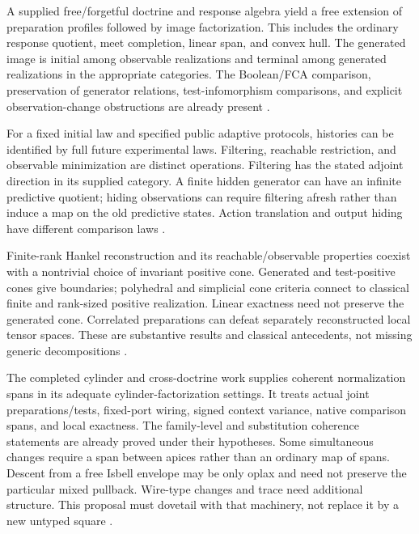 \documentclass[11pt]{article}
\theoremstyle{remark}
\begin{document}
\begin{description}[style=nextline,leftmargin=0pt]
\item[Generated observable structure]
A supplied free/forgetful doctrine and response algebra yield a free extension of preparation profiles followed by image factorization. This includes the ordinary response quotient, meet completion, linear span, and convex hull. The generated image is initial among observable realizations and terminal among generated realizations in the appropriate categories. The Boolean/FCA comparison, preservation of generator relations, test-infomorphism comparisons, and explicit observation-change obstructions are already present \cite{Core,Recovered}.

\item[Predictive reconstruction]
For a fixed initial law and specified public adaptive protocols, histories can be identified by full future experimental laws. Filtering, reachable restriction, and observable minimization are distinct operations. Filtering has the stated adjoint direction in its supplied category. A finite hidden generator can have an infinite predictive quotient; hiding observations can require filtering afresh rather than induce a map on the old predictive states. Action translation and output hiding have different comparison laws \cite{Recovered}.

\item[Linear and positive realization]
Finite-rank Hankel reconstruction and its reachable/observable properties coexist with a nontrivial choice of invariant positive cone. Generated and test-positive cones give boundaries; polyhedral and simplicial cone criteria connect to classical finite and rank-sized positive realization. Linear exactness need not preserve the generated cone. Correlated preparations can defeat separately reconstructed local tensor spaces. These are substantive results and classical antecedents, not missing generic decompositions \cite{Recovered,Positive}.

\item[Two-sided cylinder normalization]
The completed cylinder and cross-doctrine work supplies coherent normalization spans in its adequate cylinder-factorization settings. It treats actual joint preparations/tests, fixed-port wiring, signed context variance, native comparison spans, and local exactness. The family-level and substitution coherence statements are already proved under their hypotheses. Some simultaneous changes require a span between apices rather than an ordinary map of spans. Descent from a free Isbell envelope may be only oplax and need not preserve the particular mixed pullback. Wire-type changes and trace need additional structure. This proposal must dovetail with that machinery, not replace it by a new untyped square \cite{Recovered,Garner}.
\end{description}
\end{document}
